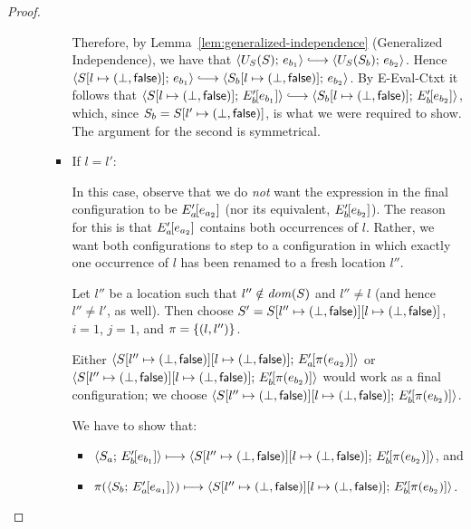 \begin{proof}
\begin{enumerate}
\begin{enumerate}
\begin{itemize}
          Therefore, by Lemma~\ref{lem:generalized-independence}
          (Generalized Independence), we have that
          $\config{U_S(S)}{e_{b_1}} \parstepsto
          \config{U_S(S_b)}{e_{b_2}}$.  Hence
          $\config{\extS{S}{l}{\bot}{\frozenfalse}}{e_{b_1}}
          \parstepsto
          \config{\extS{S_b}{l}{\bot}{\frozenfalse}}{e_{b_2}}$.  By
                 {\sc E-Eval-Ctxt} it follows that
                 $\config{\extS{S}{l}{\bot}{\frozenfalse}}{\evalctxt{E'_b}{e_{b_1}}}
                 \parstepsto
                 \config{\extS{S_b}{l}{\bot}{\frozenfalse}}{\evalctxt{E'_b}{e_{b_2}}}$,
                 which, since $S_b =
                 S[l' \mapsto (\bot, \textsf{false})]$, is what we were
                 required to show.  The argument for the second is
                 symmetrical.

        \item If $l = l'$:

          In this case, observe that we do \emph{not} want the
          expression in the final configuration to be
          $E'_a\hspace{-1mm}\left[e_{a_2}\right]$ (nor its equivalent,
          $E'_b\hspace{-1mm}\left[e_{b_2}\right]$).  The reason for this is that
          $E'_a\hspace{-1mm}\left[e_{a_2}\right]$ contains both occurrences of $l$.
          Rather, we want both configurations to step to a
          configuration in which exactly one occurrence of $l$ has
          been renamed to a fresh location $l''$.

          Let $l''$ be a location such that $l'' \notin \mathit{dom}(S)$ and
          $l'' \neq l$ (and hence $l'' \neq l'$, as well).  Then
          choose $S' =
          S[l'' \mapsto (\bot, \textsf{false})][l \mapsto (\bot, \textsf{false})]$,
          $i = 1$, $j = 1$, and $\pi = \left\{(l, l'')\right\}$.

          Either
          $\langle S[l'' \mapsto (\bot, \textsf{false})][l \mapsto (\bot, \textsf{false})];\, E'_a\hspace{-1mm}\left[\pi(e_{a_2})\right] \rangle$
          or
          $\langle S[l'' \mapsto (\bot, \textsf{false})][l \mapsto (\bot, \textsf{false})];\, E'_b\hspace{-1mm}\left[\pi(e_{b_2})\right] \rangle$
          would work as a final configuration; we choose
          $\langle S[l'' \mapsto (\bot, \textsf{false})][l \mapsto (\bot, \textsf{false})];\, E'_b\hspace{-1mm}\left[\pi(e_{b_2})\right] \rangle$.

          We have to show that:
          \begin{itemize}
          \item $\langle S_a;\, E'_b\hspace{-1mm}\left[e_{b_1}\right] \rangle \longmapsto
            \langle S[l'' \mapsto (\bot, \textsf{false})][l \mapsto (\bot, \textsf{false})];\, E'_b\hspace{-1mm}\left[\pi(e_{b_2})\right] \rangle$,
            and
          \item $\pi(\langle S_b;\, E'_a\hspace{-1mm}\left[e_{a_1}\right] \rangle)
            \longmapsto
            \langle S[l'' \mapsto (\bot, \textsf{false})][l \mapsto (\bot, \textsf{false})];\, E'_b\hspace{-1mm}\left[\pi(e_{b_2})\right] \rangle$.
          \end{itemize}


\end{itemize}
\end{enumerate}
\end{enumerate}
\end{proof}
